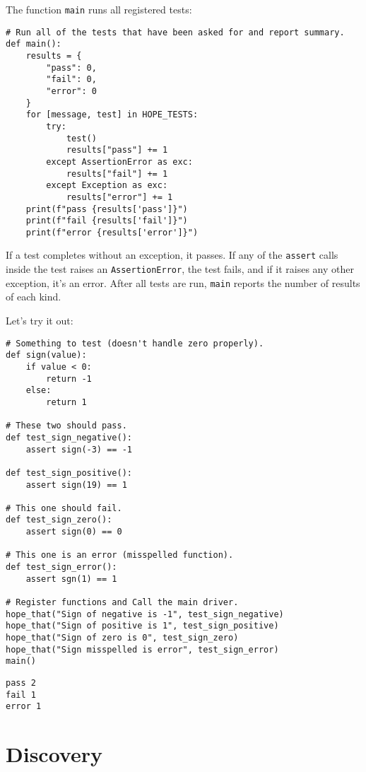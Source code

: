 \documentclass{scrbook}
\begin{document}
The function \texttt{main} runs all registered tests:


\begin{lstlisting}[frame=single,frameround=tttt]
# Run all of the tests that have been asked for and report summary.
def main():
    results = {
        "pass": 0,
        "fail": 0,
        "error": 0
    }
    for [message, test] in HOPE_TESTS:
        try:
            test()
            results["pass"] += 1
        except AssertionError as exc:
            results["fail"] += 1
        except Exception as exc:
            results["error"] += 1
    print(f"pass {results['pass']}")
    print(f"fail {results['fail']}")
    print(f"error {results['error']}")
\end{lstlisting}



\noindent If a test completes without an exception, it passes.
If any of the \texttt{assert} calls inside the test raises an \texttt{AssertionError},
the test fails,
and if it raises any other exception,
it's an error.
After all tests are run,
\texttt{main} reports the number of results of each kind.


Let's try it out:


\begin{lstlisting}[frame=single,frameround=tttt]
# Something to test (doesn't handle zero properly).
def sign(value):
    if value < 0:
        return -1
    else:
        return 1

# These two should pass.
def test_sign_negative():
    assert sign(-3) == -1

def test_sign_positive():
    assert sign(19) == 1

# This one should fail.
def test_sign_zero():
    assert sign(0) == 0

# This one is an error (misspelled function).
def test_sign_error():
    assert sgn(1) == 1

# Register functions and Call the main driver.
hope_that("Sign of negative is -1", test_sign_negative)
hope_that("Sign of positive is 1", test_sign_positive)
hope_that("Sign of zero is 0", test_sign_zero)
hope_that("Sign misspelled is error", test_sign_error)
main()
\end{lstlisting}



\begin{lstlisting}[frame=single,frameround=tttt]
pass 2
fail 1
error 1
\end{lstlisting}


\section{Discovery}\label{tester-discovery}
\end{document}
